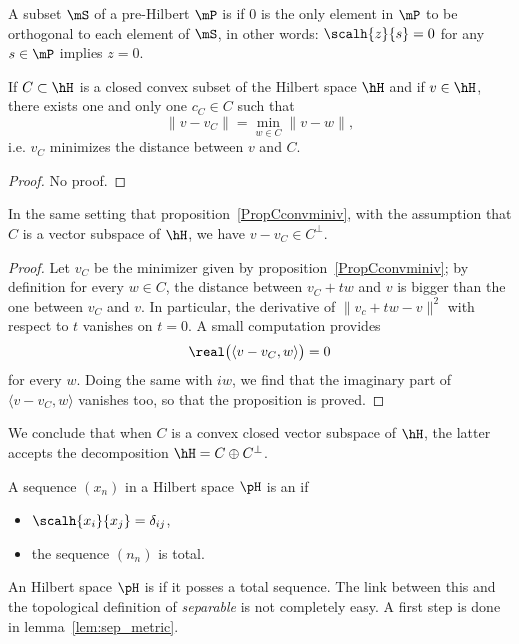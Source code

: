 A subset $\mS$ of a pre-Hilbert $\mP$ is  if $0$ is the only element in $\mP$ to be orthogonal to each element of $\mS$, in other words: $\scalh{z}{s}=0$ for any $s\in\mP$ implies $z=0$.

\begin{proposition}		\label{PropCconvminiv}
If $C\subset\hH$ is a closed convex subset of the Hilbert space $\hH$ and if $v\in\hH$, there exists one and only one $c_C\in C$ such that
\[
  \| v-v_C \|=\min_{w\in C}\| v-w \|,
\]
i.e. $v_C$ minimizes the distance between $v$ and $C$.
\end{proposition}
\begin{proof}
No proof.
\end{proof}

\begin{proposition}
In the same setting that proposition~\ref{PropCconvminiv}, with the assumption that $C$ is a vector subspace of $\hH$, we have $v-v_C\in C^{\perp}$.
\end{proposition}

\begin{proof}
Let $v_C$ be the minimizer given by proposition~\ref{PropCconvminiv}; by definition for every $w\in C$, the distance between $v_C+tw$ and $v$ is bigger than the one between $v_C$ and $v$. In particular, the derivative of $\| v_c+tw-v \|^2$ with respect to $t$ vanishes on $t=0$. A small computation provides
\[
  \real\big( \langle v-v_C, w\rangle  \big)=0
\]
for every $w$. Doing the same with $iw$, we find that the imaginary part of $\langle v-v_C, w\rangle $ vanishes too, so that the proposition is proved.
\end{proof}

We conclude that when $C$ is a convex closed vector subspace of $\hH$, the latter accepts the decomposition $\hH=C\oplus C^{\perp}$.

A sequence $(x_n)$ in a Hilbert space $\pH$ is an   if
\begin{itemize}
\item $\scalh{x_i}{x_j}=\delta_{ij}$,
\item the sequence $(n_n)$ is total.
\end{itemize}

An Hilbert space $\pH$ is  if it posses a total sequence. The link between this and the topological definition of \emph{separable} is not completely easy. A first step is done in lemma~\ref{lem:sep_metric}.

